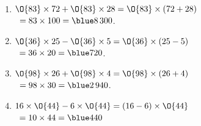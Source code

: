    \ \\ [-5mm]
   \begin{enumerate}
      \item $\O{83}\times72+\O{83} \times28 =\O{83}\times(72+28)$ \\
         \quad\, $=83\times100 =\blue 8\,300$.
      \item $\O{36}\times25-\O{36}\times5 =\O{36}\times(25-5)$ \\
         \quad\, $=36\times20 =\blue 720$.
      \item $\O{98}\times26+\O{98}\times4 =\O{98}\times(26+4)$ \\
         \quad\, $=98\times30 =\blue 2\,940$.
      \item $16\times\O{44}-6\times\O{44} =(16-6)\times\O{44}$ \\
         \quad\, $=10\times44 =\blue 440$
   \end{enumerate}
